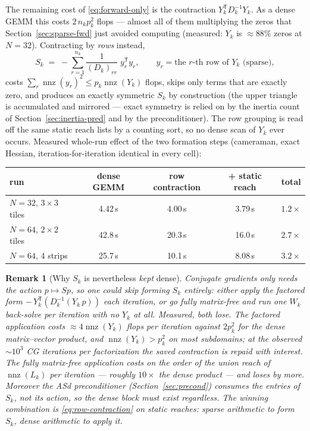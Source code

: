 \documentclass[11pt]{article}
\newtheorem{remark}{Remark}
\begin{document}
The remaining cost of \eqref{eq:forward-only} is the contraction
$Y_k^{\mathsf T} D_k^{-1} Y_k$.  As a dense GEMM this costs
$2\,n_k p_k^2$ flops --- almost all of them multiplying the zeros that
Section~\ref{sec:sparse-fwd} just avoided computing (measured: $Y_k$ is
$\approx 88\%$ zeros at $N=32$).  Contracting by \emph{rows} instead,
\begin{equation}
  S_k \;=\; -\sum_{r=1}^{n_k} \frac{1}{(D_k)_{rr}}\; y_r^{\mathsf T} y_r,
  \qquad y_r = \text{the $r$-th row of } Y_k \text{ (sparse)},
  \label{eq:row-contraction}
\end{equation}
costs $\sum_r \operatorname{nnz}(y_r)^2 \le p_k \operatorname{nnz}(Y_k)$
flops, skips only terms that are exactly zero, and produces an exactly
symmetric $S_k$ by construction (the upper triangle is accumulated and
mirrored --- exact symmetry is relied on by the inertia count of
Section~\ref{sec:inertia-pred} and by the preconditioner).  The row
grouping is read off the same static reach lists by a counting sort, so no
dense scan of $Y_k$ ever occurs.  Measured whole-run effect of the two
formation steps (cameraman, exact Hessian, iteration-for-iteration
identical in every cell):
\begin{center}
\begin{tabular}{lcccc}
\toprule
run & dense GEMM & row contraction & + static reach & total\\
\midrule
$N=32$, $3\times 3$ tiles & 4.42\,s & 4.00\,s & 3.79\,s & $1.2\times$\\
$N=64$, $2\times 2$ tiles & 42.8\,s & 20.3\,s & 16.0\,s & $2.7\times$\\
$N=64$, $4$ strips        & 25.7\,s & 10.1\,s & 8.08\,s & $3.2\times$\\
\bottomrule
\end{tabular}
\end{center}

\begin{remark}[Why $S_k$ is nevertheless \emph{kept} dense]
Conjugate gradients only needs the action $p \mapsto S p$, so one could skip
forming $S_k$ entirely: either apply the factored form
$-\,Y_k^{\mathsf T}(D_k^{-1}(Y_k\,p))$ each iteration, or go fully
matrix-free and run one $W_k$ back-solve per iteration with no $Y_k$ at all.
Measured, both lose.  The factored application costs
$\approx 4\operatorname{nnz}(Y_k)$ flops per iteration against $2 p_k^2$ for
the dense matrix--vector product, and $\operatorname{nnz}(Y_k) > p_k^2$ on
most subdomains; at the observed $\sim\!10^3$ CG iterations per
factorization the saved contraction is repaid with interest.  The fully
matrix-free application costs on the order of the union reach of
$\operatorname{nnz}(L_k)$ per iteration --- roughly $10\times$ the dense
product --- and loses by more.  Moreover the ASd preconditioner
(Section~\ref{sec:precond}) consumes the \emph{entries} of $S_k$, not its
action, so the dense block must exist regardless.  The winning combination
is \eqref{eq:row-contraction} on static reaches: sparse arithmetic to
\emph{form} $S_k$, dense arithmetic to \emph{apply} it.
\end{remark}
\end{document}
